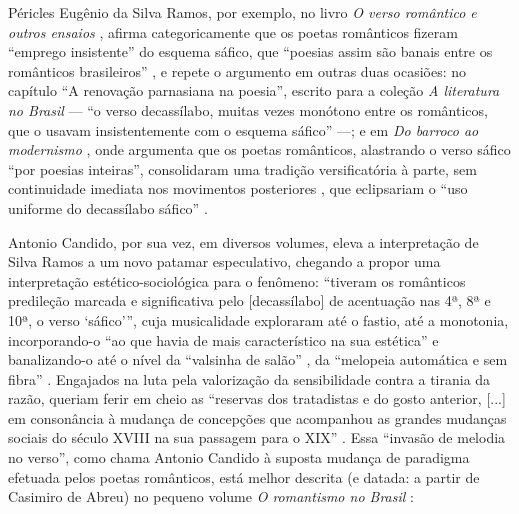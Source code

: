 \documentclass[portuguese]{textolivre}
\begin{document}
Péricles Eugênio da Silva Ramos, por exemplo, no livro \textit{O verso romântico e outros ensaios} \cite[p.~9]{ramos1959verso}, afirma categoricamente que os poetas românticos fizeram “emprego insistente” do esquema sáfico, que “poesias assim são banais entre os românticos brasileiros” \cite[p.~26]{ramos1959verso}, e repete o argumento em outras duas ocasiões: no capítulo “A renovação parnasiana na poesia”, escrito para a coleção \textit{A literatura no Brasil} — “o verso decassílabo, muitas vezes monótono entre os românticos, que o usavam insistentemente com o esquema sáfico” \cite[p.~128]{ramos1969renovacao} —; e em \textit{Do barroco ao modernismo} \cite{ramos1968barroco}, onde argumenta que os poetas românticos, alastrando o verso sáfico “por poesias inteiras”, consolidaram uma tradição versificatória à parte, sem continuidade imediata nos movimentos posteriores \cite[p.~74]{ramos1968barroco}, que eclipsariam o “uso uniforme do decassílabo sáfico” \cite[p.~162]{ramos1968barroco}.

Antonio Candido, por sua vez, em diversos volumes, eleva a interpretação de Silva Ramos a um novo patamar especulativo, chegando a propor uma interpretação estético-sociológica para o fenômeno: “tiveram os românticos predileção marcada e significativa pelo [decassílabo] de acentuação nas 4ª, 8ª e 10ª, o verso ‘sáfico’”, cuja musicalidade exploraram até o fastio, até a monotonia, incorporando-o “ao que havia de mais característico na sua estética” e banalizando-o até o nível da “valsinha de salão” \cite[p.~36]{candido2000formacao}, da “melopeia automática e sem fibra” \cite[p.~221]{candido2000formacao}. Engajados na luta pela valorização da sensibilidade contra a tirania da razão, queriam ferir em cheio as “reservas dos tratadistas e do gosto anterior, [...] em consonância à mudança de concepções que acompanhou as grandes mudanças sociais do século XVIII na sua passagem para o XIX” \cite[p.~56]{candido1996estudo}. Essa “invasão de melodia no verso”, como chama Antonio Candido à suposta mudança de paradigma efetuada pelos poetas românticos, está melhor descrita (e datada: a partir de Casimiro de Abreu) no pequeno volume \textit{O romantismo no Brasil} \cite[p.~64-65]{candido2002romantismo}:
\end{document}
